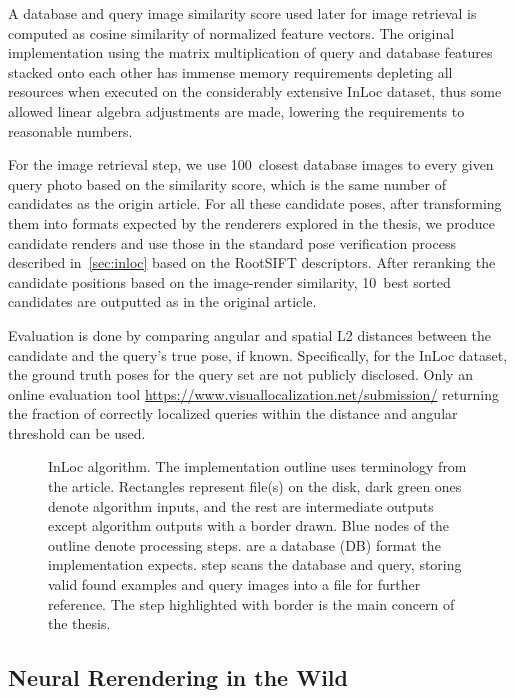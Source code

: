 A database and query image similarity score used later for image retrieval is computed as
cosine similarity of normalized feature vectors. The original implementation using the
matrix multiplication of query and database features stacked onto each other has immense
memory requirements depleting all resources when executed on the considerably extensive
InLoc dataset, thus some allowed linear algebra adjustments are made, lowering the
requirements to reasonable numbers.

For the image retrieval step, we use 100~closest database images to every given query
photo based on the similarity score, which is the same number of candidates as the origin
article.  For all these candidate poses, after transforming them into formats expected by
the renderers explored in the thesis, we produce candidate renders and use those in the
standard pose verification process described in~\cref{sec:inloc} based on the RootSIFT
descriptors. After reranking the candidate positions based on the image-render similarity,
10~best sorted candidates are outputted as in the original article.

Evaluation is done by comparing angular and spatial L2 distances between the candidate and
the query's true pose, if known. Specifically, for the InLoc dataset, the ground truth
poses for the query set are not publicly disclosed. Only an online evaluation tool
\url{https://www.visuallocalization.net/submission/} returning the fraction of correctly
localized queries within the distance and angular threshold can be used.

\begin{figure}
    \centering
    
    \caption{InLoc algorithm. The implementation
    outline uses terminology from the article. Rectangles represent file(s) on the disk,
    dark green ones denote algorithm inputs, and the rest are intermediate outputs except
    algorithm outputs with a border drawn. Blue nodes of the outline denote processing
    steps.   are a database (DB) format the implementation expects.
     step scans the database and query, storing valid found examples and
    query images into a file for further reference. The  step highlighted
    with border is the main concern of the thesis.}
    \label{fig:inloc_pathway}
\end{figure}

\subsection{Neural Rerendering in the Wild}

